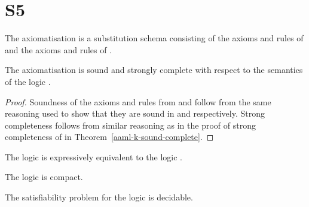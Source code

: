 \section{S5}

\begin{definition}
The axiomatisation \axiomAamlS{} is a substitution schema consisting of the axioms and rules of \axiomAmlS{} and the axioms and rules of \axiomRmlS{}.
\end{definition}

\begin{theorem}
The axiomatisation \axiomRmlS{} is sound and strongly complete with respect to the semantics of the logic \logicAamlS{}.
\end{theorem}

\begin{proof}
Soundness of the axioms and rules from \axiomAmlS{} and \axiomRmlS{} follow from the same reasoning used to show that they are sound in \logicAmlS{} and \logicRmlS{} respectively.
Strong completeness follows from similar reasoning as in the proof of strong completeness of \axiomAamlK{} in Theorem~\ref{aaml-k-sound-complete}.
\end{proof}

\begin{corollary}
The logic \logicAamlS{} is expressively equivalent to the logic \logicS{}.
\end{corollary}

\begin{corollary}
The logic \logicAamlS{} is compact.
\end{corollary}

\begin{corollary}
The satisfiability problem for the logic \logicAamlS{} is decidable.
\end{corollary}

